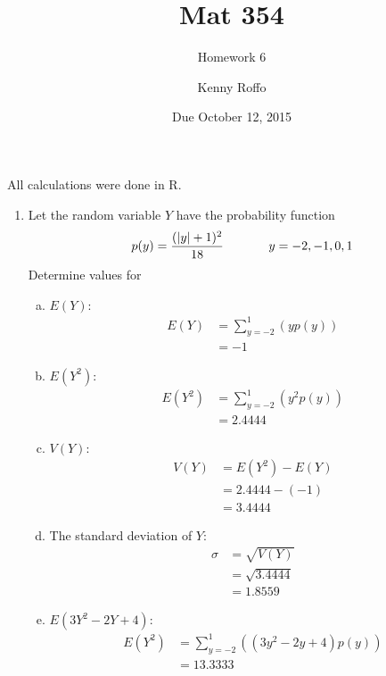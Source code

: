 \documentclass{scrartcl}
\title{Mat 354}
\subtitle{Homework 6}
\author{Kenny Roffo}
\date{Due October 12, 2015}
\begin{document}
\maketitle

All calculations were done in R.

\begin{enumerate}

\item Let the random variable $Y$ have the probability function $$p(y) = \frac{(|y|+1)^2}{18}\text{\hspace{.5in}}y=-2,-1,0,1$$ Determine values for

\begin{enumerate}[a)]
\item $E(Y)$:\\

\begin{align*}
  E(Y) &= \sum_{y=-2}^1\left(yp(y)\right)\\
       &= -1
\end{align*}

\item $E(Y^2)$:\\
\begin{align*}
  E(Y^2) &= \sum_{y=-2}^1\left(y^2p(y)\right)\\
       &= 2.4444
\end{align*}

\item $V(Y)$:\\
\begin{align*}
  V(Y) &= E(Y^2) - E(Y)\\
       &= 2.4444 - (-1)\\
       &= 3.4444
\end{align*}

\item The standard deviation of $Y$:\\
  \begin{align*}
    \sigma &= \sqrt{V(Y)}\\
           &= \sqrt{3.4444}\\
           &= 1.8559
  \end{align*}

\item $E(3Y^2-2Y+4)$:\\
\begin{align*}
  E(Y^2) &= \sum_{y=-2}^1\left((3y^2-2y+4)p(y)\right)\\
       &= 13.3333
\end{align*}
\end{enumerate}


\end{enumerate}
\end{document}
